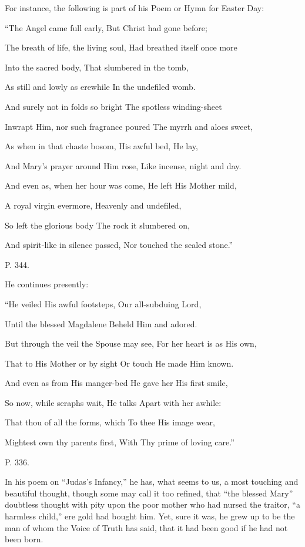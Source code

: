 For instance, the following is part of his Poem
or Hymn for Easter Day:

``The
Angel came full early, But Christ had gone before;

The breath of life, the living soul, Had breathed itself once more

Into the sacred body, That slumbered in the tomb,

As still and lowly as erewhile In the undefiled womb.

And surely not in folds so bright The spotless winding-sheet

Inwrapt Him, nor such fragrance poured The myrrh and aloes sweet,

As when in that chaste bosom, His awful bed, He lay,

And Mary's prayer around Him rose, Like incense, night and day.

And even as, when her hour was come, He left His Mother mild,

A royal virgin evermore, Heavenly and undefiled,

So left the glorious body The rock it slumbered on,

And spirit-like in silence passed, Nor touched the sealed stone.''

P. 344.

He continues presently:

``He
veiled His awful footsteps, Our all-subduing Lord,

Until the blessed Magdalene Beheld Him and adored. 

But through the veil the Spouse may see, For her heart is as His own,

That to His Mother or by sight Or touch He made Him known.

And even as from His manger-bed He gave her His first smile,

So now, while seraphs wait, He talks Apart with her awhile:

That thou of all the forms, which To thee His image wear,

Mightest own thy parents first, With Thy prime of loving care.''

P. 336.

In his poem on ``Judas's Infancy,'' he has, what
seems to us, a most touching and beautiful thought, though some may
call it too refined, that ``the blessed Mary'' doubtless thought with
pity upon the poor mother who had nursed the traitor, ``a harmless
child,'' ere gold had bought him. Yet, sure it was, he grew up to be
the man of whom the Voice of Truth has said, that it had been good if
he had not been born.

